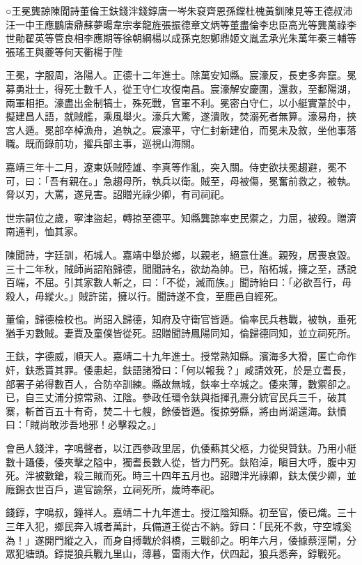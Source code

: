 
\begin{pinyinscope}
○王冕龔諒陳聞詩董倫王鈇錢泮錢錞唐一岑朱裒齊恩孫鏜杜槐黃釧陳見等王德叔沛汪一中王應鵬唐鼎蘇夢暘韋宗孝龍旌張振德章文炳等董盡倫李忠臣高光等龔萬祿李世勛翟英等管良相李應期等徐朝綱楊以成孫克恕鄭鼎姬文胤孟承光朱萬年秦三輔等張瑤王與夔等何天衢楊于陛

王冕，字服周，洛陽人。正德十二年進士。除萬安知縣。宸濠反，長吏多奔竄。冕募勇壯士，得死士數千人，從王守仁攻復南昌。宸濠解安慶圍，還救，至鄱陽湖，兩軍相拒。濠盡出金制犒士，殊死戰，官軍不利。冕密白守仁，以小艇實葦於中，擬建昌人語，就賊艦，乘風舉火。濠兵大驚，遂潰敗，焚溺死者無算。濠易舟，挾宮人遁。冕部卒棹漁舟，追執之。宸濠平，守仁封新建伯，而冕未及敘，坐他事落職。既而錄前功，擢兵部主事，巡視山海關。

嘉靖三年十二月，遼東妖賊陸雄、李真等作亂，突入關。侍吏欲扶冕趨避，冕不可，曰：「吾有親在。」急趨母所，執兵以衛。賊至，母被傷，冕奮前救之，被執。脅以刃，大罵，遂見害。詔贈光祿少卿，有司祠祀。

世宗嗣位之歲，寧津盜起，轉掠至德平。知縣龔諒率吏民禦之，力屈，被殺。贈濟南通判，恤其家。

陳聞詩，字廷訓，柘城人。嘉靖中舉於鄉，以親老，絕意仕進。親歿，居喪哀毀。三十二年秋，賊師尚詔陷歸德，聞聞詩名，欲劫為帥。已，陷柘城，擁之至，誘說百端，不屈。引其家數人斬之，曰：「不從，滅而族。」聞詩紿曰：「必欲吾行，毋殺人，毋縱火。」賊許諾，擁以行。聞詩遂不食，至鹿邑自經死。

董倫，歸德檢校也。尚詔入歸德，知府及守衛官皆遁。倫率民兵巷戰，被執，垂死猶手刃數賊。妻賈及童僕皆從死。詔贈聞詩鳳陽同知，倫歸德同知，並立祠死所。

王鈇，字德威，順天人。嘉靖二十九年進士。授常熟知縣。濱海多大猾，匿亡命作奸，鈇悉貰其罪。倭患起，鈇語諸猾曰：「何以報我？」咸請效死，於是立耆長，部署子弟得數百人，合防卒訓練。縣故無城，鈇率士卒城之。倭來薄，數禦卻之。已，自三丈浦分掠常熟、江陰。參政任環令鈇與指揮孔燾分統官民兵三千，破其寨，斬首百五十有奇，焚二十七艘，餘倭皆遁。復掠勞縣，將由尚湖還海。鈇憤曰：「賊尚敢涉吾地邪！必擊殺之。」

會邑人錢泮，字鳴聲者，以江西參政里居，仇倭爇其父柩，力從臾贊鈇。乃用小艇數十躡倭，倭夾擊之隘中，獨耆長數人從，皆力鬥死。鈇陷淖，瞋目大呼，腹中刃死。泮被數鎗，殺三賊而死。時三十四年五月也。詔贈泮光祿卿，鈇太僕少卿，並廕錦衣世百戶，遣官諭祭，立祠死所，歲時奉祀。

錢錞，字鳴叔，鐘祥人。嘉靖二十九年進士。授江陰知縣。初至官，倭已熾。三十三年入犯，鄉民奔入城者萬計，兵備道王從古不納。錞曰：「民死不救，守空城奚為！」遂開門縱之入，而身自搏戰於斜橋，三戰卻之。明年六月，倭據蔡涇閘，分眾犯塘頭。錞提狼兵戰九里山，薄暮，雷雨大作，伏四起，狼兵悉奔，錞戰死。


\end{pinyinscope}
